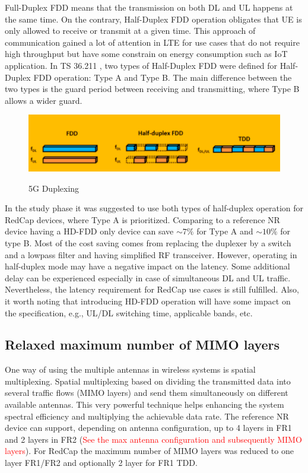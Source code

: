 \documentclass[conference]{IEEEtran}
\begin{document}
 Full-Duplex FDD means that the transmission on both DL and UL happens at the same time. On the contrary, Half-Duplex FDD operation obligates that UE is only allowed to receive or transmit at a given time.  This approach of communication gained a lot of attention in LTE for use cases that do not require high throughput but have some constrain on energy consumption such as IoT application. In TS 36.211 \cite{3gpp_nr_2022-2_38.211}, two types of Half-Duplex FDD were defined for Half-Duplex FDD operation: Type A and Type B. The main difference between the two types is the guard period between receiving and transmitting, where Type B allows a wider guard.
\begin{figure}
    \centering
    \includegraphics[width=\linewidth]{Pictures/5G Duplexing.png}
    \label{fig:5g-duplexing}
    \caption{5G Duplexing}
\end{figure}

In the study phase it was suggested to use both types of half-duplex operation  for RedCap devices, where Type A is prioritized.
Comparing to a reference NR device having a HD-FDD only device can save  $\sim7\%$ for Type A and $\sim10\%$ for type B. Most of the cost saving comes from replacing the duplexer by a switch and a lowpass filter and having simplified RF transceiver.
However, operating in half-duplex mode may have a negative impact on the latency. Some additional delay can be experienced especially in case of simultaneous DL and UL traffic. Nevertheless, the latency requirement for RedCap use cases is still fulfilled. Also, it worth noting that introducing HD-FDD operation will have some impact on the specification, e.g., UL/DL switching time, applicable bands, etc. 


\subsection{Relaxed maximum number of MIMO layers}
\label{sec:4-4}

One way of using the multiple antennas in wireless systems is spatial multiplexing. Spatial multiplexing based on dividing the transmitted data into several traffic flows (MIMO layers) and send them simultaneously on different available antennas. This very powerful technique helps enhancing the system spectral efficiency and multiplying the achievable data rate.
The reference NR device can support, depending on antenna configuration, up to 4 layers in FR1 and 2 layers in FR2 (\textcolor{red}{See the max antenna configuration and subsequently MIMO layers}). 
For RedCap the maximum number of MIMO layers was reduced to one layer FR1/FR2 and optionally 2 layer for FR1 TDD.
\end{document}
